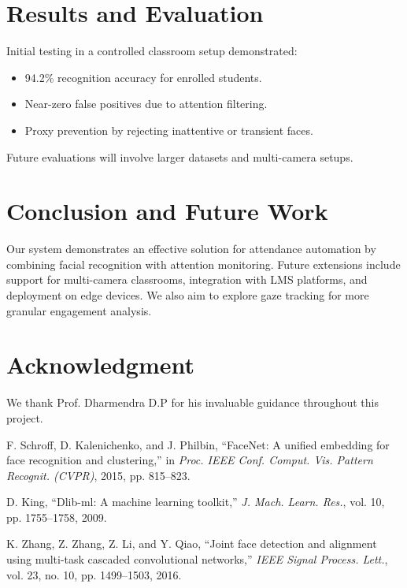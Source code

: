 \documentclass[conference]{IEEEtran}
\begin{document}
\section{Results and Evaluation}
Initial testing in a controlled classroom setup demonstrated:
\begin{itemize}
    \item 94.2\% recognition accuracy for enrolled students.
    \item Near-zero false positives due to attention filtering.
    \item Proxy prevention by rejecting inattentive or transient faces.
\end{itemize}
Future evaluations will involve larger datasets and multi-camera setups.

\section{Conclusion and Future Work}
Our system demonstrates an effective solution for attendance automation by combining facial recognition with attention monitoring. Future extensions include support for multi-camera classrooms, integration with LMS platforms, and deployment on edge devices. We also aim to explore gaze tracking for more granular engagement analysis.

\section*{Acknowledgment}
We thank Prof. Dharmendra D.P for his invaluable guidance throughout this project.


\begin{thebibliography}{1}

F. Schroff, D. Kalenichenko, and J. Philbin, ``FaceNet: A unified embedding for face recognition and clustering,'' in \textit{Proc. IEEE Conf. Comput. Vis. Pattern Recognit. (CVPR)}, 2015, pp. 815--823.

D. King, ``Dlib-ml: A machine learning toolkit,'' \textit{J. Mach. Learn. Res.}, vol. 10, pp. 1755--1758, 2009.

K. Zhang, Z. Zhang, Z. Li, and Y. Qiao, ``Joint face detection and alignment using multi-task cascaded convolutional networks,'' \textit{IEEE Signal Process. Lett.}, vol. 23, no. 10, pp. 1499--1503, 2016.

\end{thebibliography}
\end{document}
